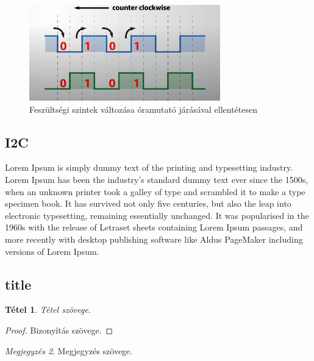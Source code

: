 \documentclass[
]{thesis-ekf}
\newtheorem{tetel}{Tétel}[chapter]
\theoremstyle{definition}
\theoremstyle{remark}
\newtheorem{megjegyzes}[tetel]{Megjegyzés}
\begin{document}
			\begin{figure}[h]
				\centering
				\includegraphics[scale=1.2]{./images/fullencback}
				\caption{Feszültségi szintek változása óramutató járásával ellentétesen}
				\label{fig:fullencback}
			\end{figure}
		\clearpage
		\subsection{I2C}
			\par Lorem Ipsum is simply dummy text of the printing and typesetting industry. Lorem Ipsum has been the industry's standard dummy text ever since the 1500s, when an unknown printer took a galley of type and scrambled it to make a type specimen book. It has survived not only five centuries, but also the leap into electronic typesetting, remaining essentially unchanged. It was popularised in the 1960s with the release of Letraset sheets containing Lorem Ipsum passages, and more recently with desktop publishing software like Aldus PageMaker including versions of Lorem Ipsum.
		\subsection{title}

\begin{tetel}
Tétel szövege.
\end{tetel}

\begin{proof}
Bizonyítás szövege.
\end{proof}

\begin{megjegyzes}
Megjegyzés szövege.
\end{megjegyzes}
\end{document}
